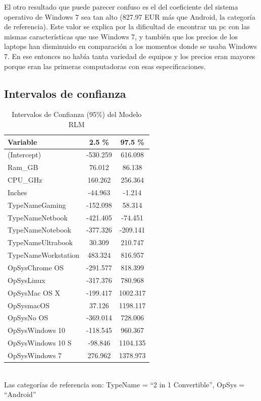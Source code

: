 \documentclass[12pt,a4paper]{article}
\begin{document}
    El otro resultado que puede parecer confuso es el del coeficiente del sistema operativo de Windows 7 sea tan alto (827.97 EUR más que Android, la categoría de referencia). Este valor se explica por la dificultad de encontrar un pc con las mismas características que use Windows 7, y también que los precios de los laptops han disminuido en comparación a los momentos donde se usaba Windows 7. En ese entonces no había tanta variedad de equipos y los precios eran mayores porque eran las primeras computadoras con esas especificaciones.

    \subsection{Intervalos de confianza}
    
    \begin{table}[H]
    \centering
    \caption{Intervalos de Confianza (95\%) del Modelo RLM}
    \begin{tabular}{lcc}
    \toprule
    \textbf{Variable} & \textbf{2.5 \%} & \textbf{97.5 \%} \\
    \midrule
    (Intercept) & -530.259 & 616.098 \\
    Ram\_GB & 76.012 & 86.138 \\
    CPU\_GHz & 160.262 & 256.364 \\
    Inches & -44.963 & -1.214 \\
    \midrule
    TypeNameGaming & -152.098 & 58.314 \\
    TypeNameNetbook & -421.405 & -74.451 \\
    TypeNameNotebook & -377.326 & -209.141 \\
    TypeNameUltrabook & 30.309 & 210.747 \\
    TypeNameWorkstation & 483.324 & 816.957 \\
    \midrule
    OpSysChrome OS & -291.577 & 818.399 \\
    OpSysLinux & -317.376 & 780.968 \\
    OpSysMac OS X & -199.417 & 1002.317 \\
    OpSysmacOS & 37.126 & 1198.117 \\
    OpSysNo OS & -369.014 & 728.006 \\
    OpSysWindows 10 & -118.545 & 960.367 \\
    OpSysWindows 10 S & -98.846 & 1104.135 \\
    OpSysWindows 7 & 276.962 & 1378.973 \\
    \bottomrule
    \end{tabular}
    \\[0.3cm]
    \small Las categorías de referencia son: TypeName = ``2 in 1 Convertible'', OpSys = ``Android''
    \end{table}
\end{document}
